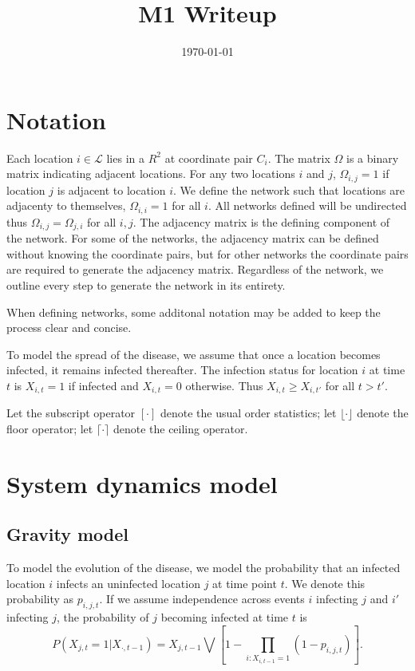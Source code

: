 \documentclass[11pt]{article}
\date{\today}
\title{M1 Writeup}
\begin{document}
\maketitle
\tableofcontents


\section{Notation}
\label{sec-1}

Each location $i \in \mathcal{L}$ lies in a $R^2$ at coordinate pair
$C_i$.  The matrix $\Omega$ is a binary matrix indicating adjacent
locations.  For any two locations $i$ and $j$, $\Omega_{i,j} = 1$ if
location $j$ is adjacent to location $i$.  We define the network such
that locations are adjacenty to themselves, $\Omega_{i,i} = 1$ for all
$i$.  All networks defined will be undirected thus $\Omega_{i,j} =
\Omega_{j,i}$ for all $i,j$.  The adjacency matrix is the defining
component of the network.  For some of the networks, the adjacency
matrix can be defined without knowing the coordinate pairs, but for
other networks the coordinate pairs are required to generate the
adjacency matrix.  Regardless of the network, we outline every step to
generate the network in its entirety.

When defining networks, some additonal notation may be added to keep
the process clear and concise.

To model the spread of the disease, we assume that once a location
becomes infected, it remains infected thereafter.  The infection
status for location $i$ at time $t$ is $X_{i,t} = 1$ if infected and
$X_{i,t} = 0$ otherwise.  Thus $X_{i,t} \ge X_{i,t'}$ for all $t > t'$.

Let the subscript operator $[\cdot]$ denote the usual order
statistics; let $\lfloor \cdot \rfloor$ denote the floor operator; let
$\lceil \cdot \rceil$ denote the ceiling operator.


\section{System dynamics model}
\label{sec-2}

\subsection{Gravity model}
\label{sec-2-1}

To model the evolution of the disease, we model the probability that
an infected location $i$ infects an uninfected location $j$ at time
point $t$.  We denote this probability as $p_{i,j,t}$.  If we assume
independence across events $i$ infecting $j$ and $i'$ infecting $j$,
the probability of $j$ becoming infected at time $t$ is
\begin{equation*}
  P(X_{j,t} = 1 | X_{\cdot,t-1}) = X_{j,t-1} \bigvee \left[1 - \prod_{i:
  X_{i,t-1} = 1} ( 1 - p_{i,j,t} ) \right].
\end{equation*}
\end{document}

